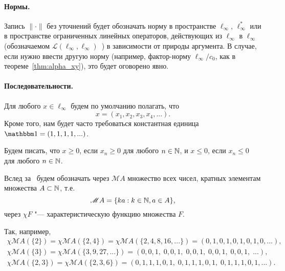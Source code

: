 \paragraph{Нормы.}
Запись $\|\cdot\|$ без уточнений будет обозначать норму в пространстве $\ell_\infty$, $\ell_\infty^*$
или в пространстве ограниченных линейных операторов, действующих из $\ell_\infty$ в $\ell_\infty$ (обозначаемом $\mathcal L (\ell_\infty, \ell_\infty)$~)
в зависимости от природы аргумента.
В случае, если нужно ввести другую норму (например, фактор-норму $\ell_\infty / c_0$, как в теореме~\ref{thm:alpha_xy}),
это будет оговорено явно.


\paragraph{Последовательности.}
Для любого $x\in\ell_\infty$ будем по умолчанию полагать, что
\begin{equation}
	x=(x_1, x_2, x_3, x_4, ...)
	.
\end{equation}
Кроме того, нам будет часто требоваться константная единица $\one = (1, 1, 1, 1, ...)$.

Будем писать, что $x\geq 0$, если $x_n \geq 0$ для любого $n\in \mathbb{N}$, и $x\leq 0$, если $x_n \leq 0$ для любого $n\in \mathbb{N}$.

Вслед за~\cite{hall1992behrend} будем обозначать через $\mathscr{M}A$ множество всех чисел,
кратных элементам множества $A\subset\mathbb{N}$, т.е.
\begin{equation}
	\mathscr{M}A = \{ka: k\in\mathbb{N}, a\in A\}
	,
\end{equation}
через $\chi F$ "--- характеристическую функцию множества $F$.

Так, например,
\begin{gather}
	\chi \mathscr{M}\!A(\{2\}) = \chi \mathscr{M}\!A(\{2, 4\}) = \chi \mathscr{M}\!A(\{2,4,8,16,...\})
	= (0,1,0,1,0,1,0,1,0,...),
\\
	\chi \mathscr{M}\!A(\{3\}) = \chi \mathscr{M}\!A(\{3,9,27,...\}) = (0,0,1,\;0,0,1,\;0,0,1,\;0,0,1,\;0,0,1,\;...),
\\
	\chi \mathscr{M}\!A(\{2,3\}) = \chi \mathscr{M}\!A(\{2,3,6\}) = (0,1,1,1,0,1,\;0,1,1,1,0,1,\;0,1,1,1,0,1,...).
\end{gather}


